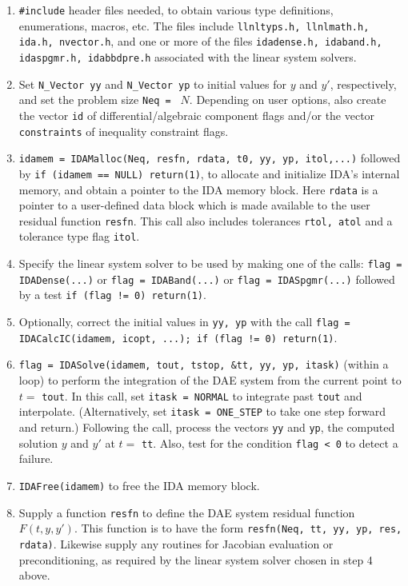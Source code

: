 \documentclass[11pt]{article}
\begin{document}
\begin{enumerate}

\item {\tt \#include} header files needed, to obtain various type
definitions, enumerations, macros, etc.  The files include
{\tt llnltyps.h, llnlmath.h, ida.h, nvector.h}, and one or more of the
files  {\tt idadense.h, idaband.h, idaspgmr.h, idabbdpre.h} associated
with the linear system solvers.

\item Set {\tt N\_Vector yy} and {\tt N\_Vector yp} to initial values 
for $y$ and $y'$, respectively, and set the problem size {\tt Neq = }
$N$.  Depending on user options, also create the vector {\tt id} of
differential/algebraic component flags and/or the vector 
{\tt constraints} of inequality constraint flags.

\item {\tt idamem = IDAMalloc(Neq, resfn, rdata, t0, yy, yp, itol,...)} 
followed by \newline
{\tt if (idamem == NULL) return(1)}, to allocate and initialize
IDA's internal memory, and obtain a pointer to the IDA memory block.  
Here {\tt rdata} is a pointer to a user-defined data block which is
made available to the user residual function {\tt resfn}.
This call also includes tolerances {\tt rtol, atol} and a 
tolerance type flag {\tt itol}.

\item Specify the linear system solver to be used by making one of the
calls: \newline 
{\tt flag = IDADense(...)} or {\tt flag = IDABand(...)} or
{\tt flag = IDASpgmr(...)} \newline
followed by a test {\tt if (flag != 0) return(1)}.

\item Optionally, correct the initial values  in {\tt yy, yp} with 
the call \newline
{\tt flag = IDACalcIC(idamem, icopt, ...); if (flag != 0) return(1)}.

\item {\tt flag = IDASolve(idamem, tout, tstop, \&tt, yy, yp, itask)} 
\newline (within a loop) to perform the integration of the DAE system 
from the current point to $t =$ {\tt tout}.  In this call, set 
{\tt itask = NORMAL} to integrate past {\tt tout} and interpolate.
(Alternatively, set {\tt itask = ONE\_STEP} to take one step forward
and return.)  Following the call, process the vectors {\tt yy} and 
{\tt yp}, the computed solution $y$ and $y'$ at $t = $ {\tt tt}.
Also, test for the condition {\tt flag < 0} to detect a failure.

\item {\tt IDAFree(idamem)} to free the IDA memory block.

\item Supply a function {\tt resfn} to define the DAE system residual 
function $F(t,y,y')$.  This function is to have the form 
{\tt resfn(Neq, tt, yy, yp, res, rdata)}.  Likewise supply any
routines for Jacobian evaluation or preconditioning, as required by
the linear system solver chosen in step 4 above.

\end{enumerate}
\end{document}
